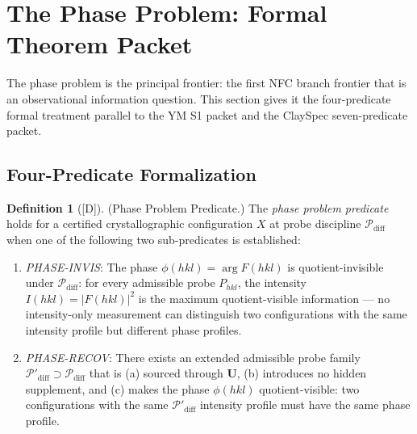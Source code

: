 \documentclass[12pt,oneside]{amsbook}
\theoremstyle{plain}
\theoremstyle{definition}
\newtheorem{definition}[theorem]{Definition}
\theoremstyle{remark}
\newcommand{\status}[1]{\textup{[#1]}}
\begin{document}
\section{The Phase Problem: Formal Theorem Packet}
\label{sec:cryst-phase-packet}

The phase problem is the principal frontier: the first NFC branch
frontier that is an observational information question.  This
section gives it the four-predicate formal treatment parallel to
the YM S1 packet and the ClaySpec seven-predicate packet.

\subsection{Four-Predicate Formalization}

\begin{definition}[\status{D}]\label{def:cryst-phase-predicate}
\textup{(Phase Problem Predicate.)}
The \emph{phase problem predicate} holds for a certified
crystallographic configuration $X$ at probe discipline
$\mathcal{P}_{\mathrm{diff}}$ when one of the following two
sub-predicates is established:

\begin{enumerate}[label=\textup{(\Alph*)}]
  \item \emph{PHASE-INVIS}: The phase $\phi(hkl) = \arg F(hkl)$
    is quotient-invisible under $\mathcal{P}_{\mathrm{diff}}$:
    for every admissible probe $P_{hkl}$, the intensity
    $I(hkl) = |F(hkl)|^2$ is the maximum quotient-visible
    information --- no intensity-only measurement can distinguish
    two configurations with the same intensity profile but different
    phase profiles.

  \item \emph{PHASE-RECOV}: There exists an extended admissible
    probe family $\mathcal{P}'_{\mathrm{diff}} \supset
    \mathcal{P}_{\mathrm{diff}}$ that is (a) sourced through
    $\mathbf{U}$, (b) introduces no hidden supplement, and
    (c) makes the phase $\phi(hkl)$ quotient-visible: two
    configurations with the same $\mathcal{P}'_{\mathrm{diff}}$
    intensity profile must have the same phase profile.
\end{enumerate}
\end{definition}
\end{document}
